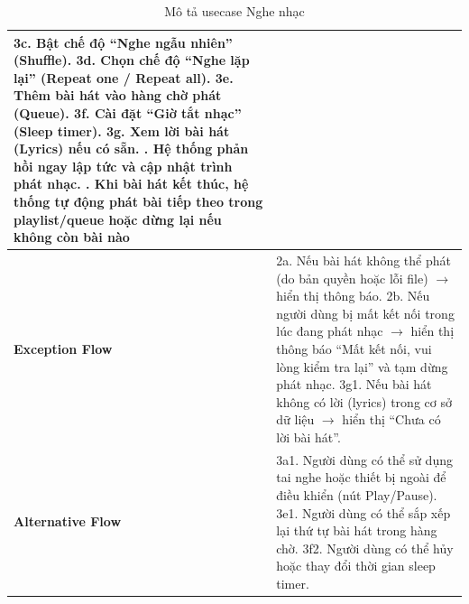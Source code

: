 \documentclass[a4paper]{article}
\newcommand{\cach}{\hspace*{1.5em}\ignorespaces}
\begin{document}
\begin{table}[h!]
\begin{tabularx}{\textwidth}{|l|X|}
  \cach 3c. Bật chế độ “Nghe ngẫu nhiên” (Shuffle). \newline
  \cach 3d. Chọn chế độ “Nghe lặp lại” (Repeat one / Repeat all). \newline
  \cach 3e. Thêm bài hát vào hàng chờ phát (Queue). \newline
  \cach 3f. Cài đặt “Giờ tắt nhạc” (Sleep timer). \newline
  \cach 3g. Xem lời bài hát (Lyrics) nếu có sẵn. \newline
  4. Hệ thống phản hồi ngay lập tức và cập nhật trình phát nhạc. \newline
  5. Khi bài hát kết thúc, hệ thống tự động phát bài tiếp theo trong playlist/queue hoặc dừng lại nếu không còn bài nào \\ \hline
\textbf{Exception Flow} 
& 2a. Nếu bài hát không thể phát (do bản quyền hoặc lỗi file) $\rightarrow$  hiển thị thông báo. \newline
  2b. Nếu người dùng bị mất kết nối trong lúc đang phát nhạc $\rightarrow$ hiển thị thông báo “Mất kết nối, vui lòng kiểm tra lại” và tạm dừng phát nhạc. \newline
  3g1. Nếu bài hát không có lời (lyrics) trong cơ sở dữ liệu $\rightarrow$ hiển thị “Chưa có lời bài hát”. \\ \hline
\textbf{Alternative Flow} 
& 3a1. Người dùng có thể sử dụng tai nghe hoặc thiết bị ngoài để điều khiển (nút Play/Pause). \newline
  3e1. Người dùng có thể sắp xếp lại thứ tự bài hát trong hàng chờ. \newline
  3f2. Người dùng có thể hủy hoặc thay đổi thời gian sleep timer. \\ \hline
\end{tabularx}
\caption{Mô tả usecase Nghe nhạc}
\end{table}
\end{document}
